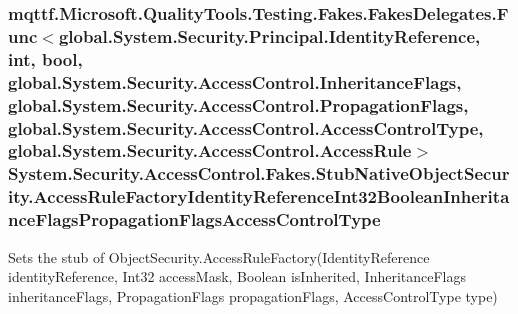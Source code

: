 \hypertarget{class_system_1_1_security_1_1_access_control_1_1_fakes_1_1_stub_native_object_security_a0d1433c2d9541372f0a7ea32aa0f061b}{
\subsubsection[{Access\-Rule\-Factory\-Identity\-Reference\-Int32\-Boolean\-Inheritance\-Flags\-Propagation\-Flags\-Access\-Control\-Type}]{\setlength{\rightskip}{0pt plus 5cm}mqttf.\-Microsoft.\-Quality\-Tools.\-Testing.\-Fakes.\-Fakes\-Delegates.\-Func$<$global.\-System.\-Security.\-Principal.\-Identity\-Reference, int, bool, global.\-System.\-Security.\-Access\-Control.\-Inheritance\-Flags, global.\-System.\-Security.\-Access\-Control.\-Propagation\-Flags, global.\-System.\-Security.\-Access\-Control.\-Access\-Control\-Type, global.\-System.\-Security.\-Access\-Control.\-Access\-Rule$>$ System.\-Security.\-Access\-Control.\-Fakes.\-Stub\-Native\-Object\-Security.\-Access\-Rule\-Factory\-Identity\-Reference\-Int32\-Boolean\-Inheritance\-Flags\-Propagation\-Flags\-Access\-Control\-Type}}\label{class_system_1_1_security_1_1_access_control_1_1_fakes_1_1_stub_native_object_security_a0d1433c2d9541372f0a7ea32aa0f061b}


Sets the stub of Object\-Security.\-Access\-Rule\-Factory(\-Identity\-Reference identity\-Reference, Int32 access\-Mask, Boolean is\-Inherited, Inheritance\-Flags inheritance\-Flags, Propagation\-Flags propagation\-Flags, Access\-Control\-Type type)

